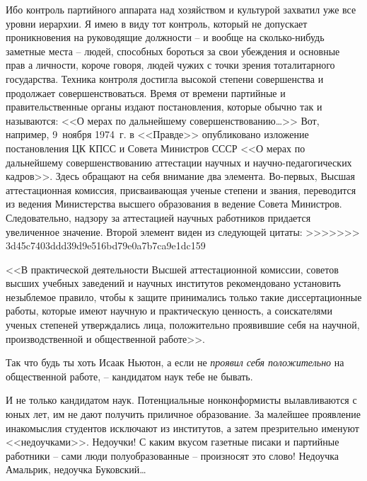 \documentclass{book}
\begin{document}
Ибо контроль партийного аппарата над хозяйством и культурой захватил уже все уровни иерархии. Я имею в виду тот контроль, который не допускает проникновения на руководящие должности -- и вообще на сколько-нибудь заметные места -- людей, способных бороться за свои убеждения и основные прав а личности, короче говоря, людей чужих с  точки зрения тоталитарного государства. Техника контроля достигла высокой степени совершенства и продолжает совершенствоваться. Время от времени партийные и правительственные органы издают постановления, которые обычно так и называются: <<О мерах по дальнейшему совершенствованию\ldots>> Вот, например, 9~ноября 1974~г. в <<Правде>> опубликовано изложение постановления ЦК КПСС и Совета Министров СССР <<О мерах по дальнейшему совершенствованию аттестации научных и научно-педагогических кадров>>. Здесь обращают на себя внимание два элемента. Во-первых, Высшая аттестационная комиссия, присваивающая ученые степени и звания, переводится из ведения Министерства высшего образования в ведение Совета Министров. Следовательно, надзору за аттестацией научных работников придается увеличенное значение. Второй элемент виден из следующей цитаты:
>>>>>>> 3d45c7403ddd39d9e516bd79e0a7b7ca9e1dc159

<<В практической деятельности Высшей аттестационной комиссии, советов высших учебных заведений и научных институтов рекомендовано установить незыблемое правило, чтобы к защите принимались только такие диссертационные работы, которые имеют научную и практическую ценность, а соискате­лями ученых степеней утверждались лица, положительно проявившие себя на научной, производственной и общественной работе>>.

Так что будь ты хоть Исаак Ньютон, а если не \textit{проявил себя положительно} на общественной работе, -- кандидатом наук тебе не бывать.

И не только кандидатом наук. Потенциальные нонконформисты вылавливаются с юных лет, им не дают получить приличное образование. За малейшее проявление инакомыслия студентов исключают из институтов, а затем презрительно именуют <<недоучками>>. Недоучки! С каким вкусом газетные писаки и партийные работники -- сами люди полуобразованные -- произносят это слово! Недоучка Амальрик, недоучка Буковский\ldots
\end{document}
